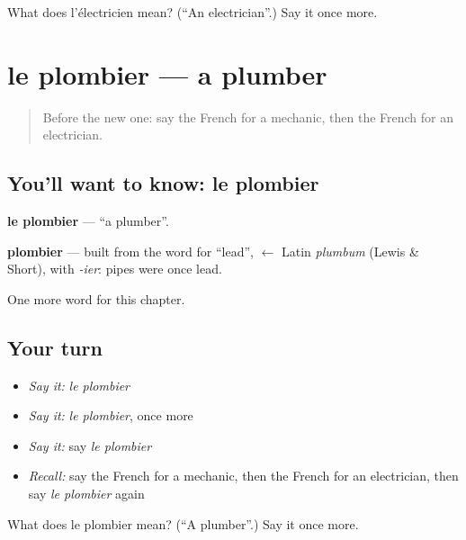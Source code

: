 \begin{tcolorbox}[breakable,colback=teal!4,colframe=teal!35!black,title={Before you move on}]
What does l'électricien mean? (\textquotedblleft{}An electrician\textquotedblright{}.) Say it once more.
\end{tcolorbox}
\section[le plombier]{le plombier — a plumber}

\label{lesson:FR-C196-plombier}



\begin{quote}
Before the new one: say the French for a mechanic, then the French for an electrician.
\end{quote}

\subsection*{You'll want to know: le plombier}
\textbf{le plombier} — \textquotedblleft{}a plumber\textquotedblright{}.

\begin{cousinweb}
\textbf{plombier} — built from the word for \textquotedblleft{}lead\textquotedblright{}, $\leftarrow$ Latin \emph{plumbum} (Lewis \& Short), with \emph{-ier}: pipes were once lead.
\end{cousinweb}

\begin{grammarlens}[title={What you've built}]
One more word for this chapter.
\end{grammarlens}

\subsection*{Your turn}
\begin{itemize}
\raggedright
  \item \emph{Say it:} \emph{le plombier}
  \item \emph{Say it:} \emph{le plombier}, once more
  \item \emph{Say it:} say \emph{le plombier}
  \item \emph{Recall:} say the French for a mechanic, then the French for an electrician, then say \emph{le plombier} again
\end{itemize}

\begin{tcolorbox}[breakable,colback=teal!4,colframe=teal!35!black,title={Before you move on}]
What does le plombier mean? (\textquotedblleft{}A plumber\textquotedblright{}.) Say it once more.
\end{tcolorbox}
